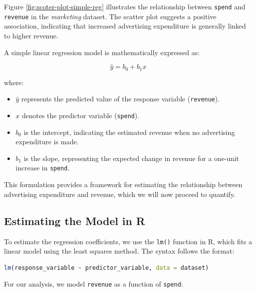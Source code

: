 \documentclass[
]{book}
\newcommand{\passthrough}[1]{#1}
\providecommand{\tightlist}{%
  \setlength{\itemsep}{0pt}\setlength{\parskip}{0pt}}
\theoremstyle{definition}
\theoremstyle{definition}
\theoremstyle{definition}
\theoremstyle{definition}
\theoremstyle{remark}
\begin{document}
Figure \ref{fig:scoter-plot-simple-reg} illustrates the relationship between \passthrough{\lstinline!spend!} and \passthrough{\lstinline!revenue!} in the \emph{marketing} dataset. The scatter plot suggests a positive association, indicating that increased advertising expenditure is generally linked to higher revenue.

A simple linear regression model is mathematically expressed as:

\[
\hat{y} = b_0 + b_1x
\]

where:

\begin{itemize}
\tightlist
\item
  \(\hat{y}\) represents the predicted value of the response variable (\passthrough{\lstinline!revenue!}).\\
\item
  \(x\) denotes the predictor variable (\passthrough{\lstinline!spend!}).\\
\item
  \(b_0\) is the intercept, indicating the estimated revenue when no advertising expenditure is made.\\
\item
  \(b_1\) is the slope, representing the expected change in revenue for a one-unit increase in \passthrough{\lstinline!spend!}.
\end{itemize}

This formulation provides a framework for estimating the relationship between advertising expenditure and revenue, which we will now proceed to quantify.

\subsection*{Estimating the Model in R}\label{estimating-the-model-in-r}

To estimate the regression coefficients, we use the \passthrough{\lstinline!lm()!} function in R, which fits a linear model using the least squares method. The syntax follows the format:

\begin{lstlisting}[language=R]
lm(response_variable ~ predictor_variable, data = dataset)
\end{lstlisting}

For our analysis, we model \passthrough{\lstinline!revenue!} as a function of \passthrough{\lstinline!spend!}:
\end{document}

